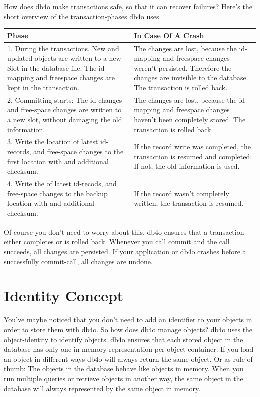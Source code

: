 How does db4o make transactions safe, so that it can recover failures? Here's the short overview of the transaction-phases db4o uses.

{\small
\begin{longtable}{|p{}|p{}|}
\hline
\textbf{Phase} & \textbf{In Case Of A Crash} \\ \hline
1. During the transactions. New and updated objects are written to a new Slot in the database-file. The id-mapping and freespace changes are kept in the transaction. & The changes are lost, because the id-mapping and freespace changes weren't persisted. Therefore the changes are invisible to the database. The transaction is rolled back. \\ \hline
2. Committing starts: The id-changes and free-space changes are written to a new slot, without damaging the old information. & The changes are lost, because the id-mapping and freespace changes haven't been completely stored. The transaction is rolled back. \\ \hline
3. Write the location of latest id-records, and free-space changes to the first location with and additional checksum. & If the record write was completed, the transaction is resumed and completed. If not, the old information is used. \\ \hline
4. Write the of latest id-recods, and free-space changes to the backup location with and additional checksum. & If the record wasn't completely written, the transaction is resumed. \\ \hline
\end{longtable}}

Of course you don't need to worry about this. db4o ensures that a transaction either completes or is rolled back. Whenever you call commit and the call succeeds, all changes are persisted. If your application or db4o crashes before a successfully commit-call, all changes are undone.

\section{Identity Concept}
\label{ref:basics-identity-concept}

You've maybe noticed that you don't need to add an identifier to your objects in order to store them with db4o. So how does db4o manage objects? db4o uses the object-identity to identify objects. db4o ensures that each stored object in the database has only one in memory representation per object container. If you load an object in different ways db4o will always return the same object. Or as rule of thumb: The objects in the database behave like objects in memory. When you run multiple queries or retrieve objects in another way, the same object in the database will always represented by the same object in memory.

